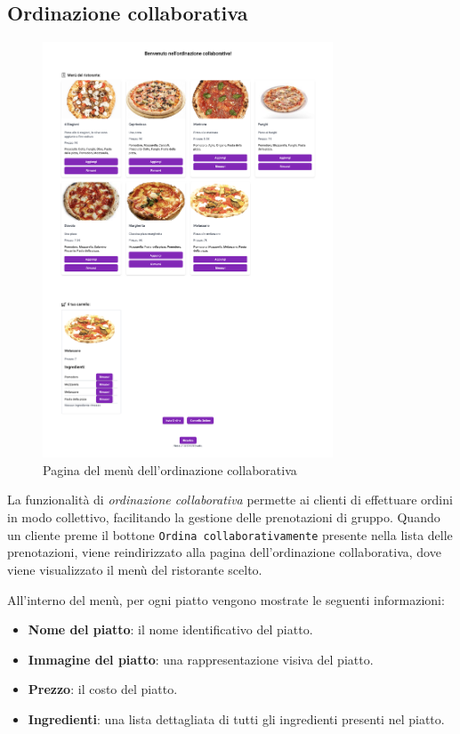 \newpage
\subsection{Ordinazione collaborativa}

\begin{figure}[htbp]
	\centering
	\includegraphics[width=0.77\textwidth]{./img/menu-ordinazione-collaborativa.png}
	\caption{Pagina del menù dell'ordinazione collaborativa}
 \end{figure}
 \newpage
La funzionalità di \textit{ordinazione collaborativa} permette ai clienti di effettuare ordini in modo collettivo, facilitando la gestione delle prenotazioni di gruppo. 
Quando un cliente preme il bottone \texttt{Ordina collaborativamente} presente nella lista delle prenotazioni, viene reindirizzato alla pagina dell'ordinazione 
collaborativa, dove viene visualizzato il menù del ristorante scelto.

All'interno del menù, per ogni piatto vengono mostrate le seguenti informazioni:
\begin{itemize}
    \item \textbf{Nome del piatto}: il nome identificativo del piatto.
    \item \textbf{Immagine del piatto}: una rappresentazione visiva del piatto.
    \item \textbf{Prezzo}: il costo del piatto.
    \item \textbf{Ingredienti}: una lista dettagliata di tutti gli ingredienti presenti nel piatto.
\end{itemize}

